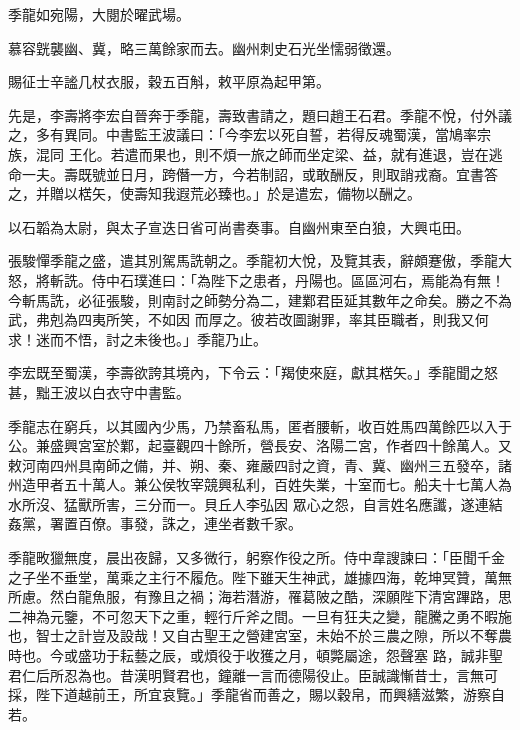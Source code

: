 \begin{pinyinscope}
 季龍如宛陽，大閱於曜武場。



 慕容皝襲幽、冀，略三萬餘家而去。幽州刺史石光坐懦弱徵還。



 賜征士辛謐几杖衣服，穀五百斛，敕平原為起甲第。



 先是，李壽將李宏自晉奔于季龍，壽致書請之，題曰趙王石君。季龍不悅，付外議之，多有異同。中書監王波議曰：「今李宏以死自誓，若得反魂蜀漢，當鳩率宗族，混同
 王化。若遣而果也，則不煩一旅之師而坐定梁、益，就有進退，豈在逃命一夫。壽既號並日月，跨僭一方，今若制詔，或敢酬反，則取誚戎裔。宜書答之，并贈以楛矢，使壽知我遐荒必臻也。」於是遣宏，備物以酬之。



 以石韜為太尉，與太子宣迭日省可尚書奏事。自幽州東至白狼，大興屯田。



 張駿憚季龍之盛，遣其別駕馬詵朝之。季龍初大悅，及覽其表，辭頗蹇傲，季龍大怒，將斬詵。侍中石璞進曰：「為陛下之患者，丹陽也。區區河右，焉能為有無！今斬馬詵，必征張駿，則南討之師勢分為二，建鄴君臣延其數年之命矣。勝之不為武，弗剋為四夷所笑，不如因
 而厚之。彼若改圖謝罪，率其臣職者，則我又何求！迷而不悟，討之未後也。」季龍乃止。



 李宏既至蜀漢，李壽欲誇其境內，下令云：「羯使來庭，獻其楛矢。」季龍聞之怒甚，黜王波以白衣守中書監。



 季龍志在窮兵，以其國內少馬，乃禁畜私馬，匿者腰斬，收百姓馬四萬餘匹以入于公。兼盛興宮室於鄴，起臺觀四十餘所，營長安、洛陽二宮，作者四十餘萬人。又敕河南四州具南師之備，并、朔、秦、雍嚴四討之資，青、冀、幽州三五發卒，諸州造甲者五十萬人。兼公侯牧宰競興私利，百姓失業，十室而七。船夫十七萬人為水所沒、猛獸所害，三分而一。貝丘人李弘因
 眾心之怨，自言姓名應讖，遂連結姦黨，署置百僚。事發，誅之，連坐者數千家。



 季龍畋獵無度，晨出夜歸，又多微行，躬察作役之所。侍中韋謏諫曰：「臣聞千金之子坐不垂堂，萬乘之主行不履危。陛下雖天生神武，雄據四海，乾坤冥贊，萬無所慮。然白龍魚服，有豫且之禍；海若潛游，罹葛陂之酷，深願陛下清宮蹕路，思二神為元鑒，不可忽天下之重，輕行斤斧之間。一旦有狂夫之變，龍騰之勇不暇施也，智士之計豈及設哉！又自古聖王之營建宮室，未始不於三農之隙，所以不奪農時也。今或盛功于耘藝之辰，或煩役于收獲之月，頓斃屬途，怨聲塞
 路，誠非聖君仁后所忍為也。昔漢明賢君也，鐘離一言而德陽役止。臣誠識慚昔士，言無可採，陛下道越前王，所宜哀覽。」季龍省而善之，賜以穀帛，而興繕滋繁，游察自若。




\end{pinyinscope}
